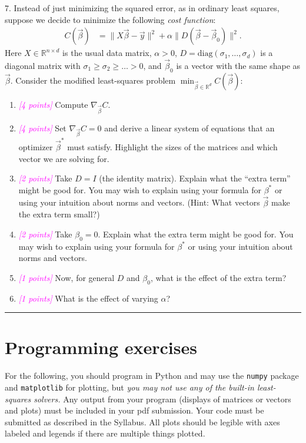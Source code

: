 \documentclass{article}
\newcommand{\R}{\mathbb{R}} %
\newcommand{\points}[1]{\small\textcolor{magenta}{\emph{[#1 points]}} \normalsize}
\begin{document}
\vspace{1em}
7. Instead of just minimizing the squared error, as in ordinary least squares, suppose we decide
to minimize the following {\em cost function}:
\begin{align*}
  C(\vec \beta) &= \| X \vec \beta - \vec y \|^2 + \alpha \| D(\vec \beta - \vec \beta_0) \|^2.
\end{align*}
Here $X \in \R^{n \times d}$ is the usual data matrix, 
$\alpha > 0$, $D = \mathrm{diag}(\sigma_1, \ldots, \sigma_d)$ 
is a diagonal matrix with $\sigma_1 \geq \sigma_2 \geq \ldots > 0$, 
and $\vec \beta_0$ is a vector with the same shape as $\vec \beta$.
Consider the modified least-squares problem
$
\min_{\vec \beta \in \R^d} C(\vec \beta):
$
\begin{enumerate}
\item \points{4} Compute $\nabla_{\vec \beta} C$. 
\item \points{4} Set $\nabla_{\vec \beta} C = 0$ and derive a linear system of equations
  that an optimizer $\vec \beta^*$ must satisfy. 
  Highlight the sizes of the matrices and which vector we are solving for.
\item \points{2} Take $D = I$ (the identity matrix). 
  Explain what the ``extra term'' might be good for.
  You may wish to explain using your formula for $\beta^*$ or using your intuition about norms and vectors.
  (Hint: What vectors $\vec \beta$ make the extra term small?)
\item \points{2} Take $\beta_0 = 0$.   Explain what the extra term might be good for.
  You may wish to explain using your formula for $\beta^*$ or using your intuition about norms and vectors.
\item \points{1} Now, for general $D$ and $\beta_0$, what is the effect of the extra term?
\item \points{1} What is the effect of varying $\alpha$?
\end{enumerate}

\begin{center}
\rule{.5\linewidth}{1pt}
\end{center}

\section*{Programming exercises}

For the following, you should program in Python and may use the
{\tt numpy} package and {\tt matplotlib} for plotting, 
but {\em you may not use any of the built-in least-squares solvers.}
Any output from your program (displays of matrices or vectors and plots) 
must be included in your pdf submission.
Your code must be submitted as described in the Syllabus.
All plots should be legible with axes labeled and legends if there are multiple things plotted.
\end{document}

